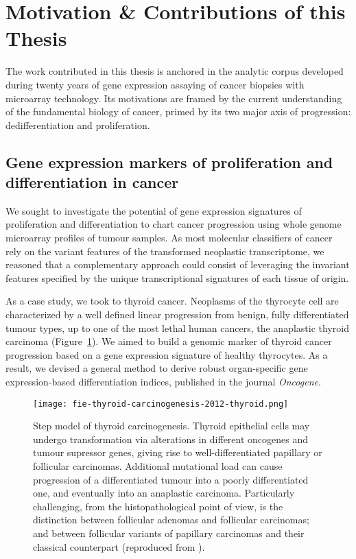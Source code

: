 \section{Motivation \& Contributions of this Thesis}

The work contributed in this thesis is anchored in the analytic corpus developed
during twenty years of gene expression assaying of cancer biopsies with
microarray technology.  Its motivations are framed by the current understanding
of the fundamental biology of cancer, primed by its two major axis of
progression: dedifferentiation and proliferation.

\subsection{Gene expression markers of proliferation and
  differentiation in cancer}
We sought to investigate the potential of gene expression signatures of
proliferation and differentiation to chart cancer progression using whole genome
microarray profiles of tumour samples.  As most molecular classifiers of cancer
rely on the variant features of the transformed neoplastic transcriptome, we
reasoned that a complementary approach could consist of leveraging the invariant
features specified by the unique transcriptional signatures of each tissue of
origin.

As a case study, we took to thyroid cancer.  Neoplasms of the thyrocyte cell are
characterized by a well defined linear progression from benign, fully
differentiated tumour types, up to one of the most lethal human cancers, the
anaplastic thyroid carcinoma (Figure~\ref{fig:thyroid-carcinogenesis}).  We
aimed to build a genomic marker of thyroid cancer progression based on a gene
expression signature of healthy thyrocytes.  As a result, we devised a general
method to derive robust \mbox{organ-specific} gene \mbox{expression-based}
differentiation indices, published in the journal
\emph{Oncogene}.\cite{tomas_general_2012}

\begin{figure}[ht]
  \texttt{[image: fie-thyroid-carcinogenesis-2012-thyroid.png]}%
  \caption[Step model of thyroid carcinogenesis]{Step model of thyroid
    carcinogenesis.  Thyroid epithelial cells may undergo transformation via
    alterations in different oncogenes and tumour supressor genes, giving rise
    to \mbox{well-differentiated} papillary or follicular carcinomas.
    Additional mutational load can cause progression of a differentiated tumour
    into a poorly differentiated one, and eventually into an anaplastic
    carcinoma.  Particularly challenging, from the histopathological point of
    view, is the distinction between follicular adenomas and follicular
    carcinomas; and between follicular variants of papillary carcinomas and
    their classical counterpart (reproduced from
    \citealp{sastre-perona_role_2012}).}
  \label{fig:thyroid-carcinogenesis}
\end{figure}

